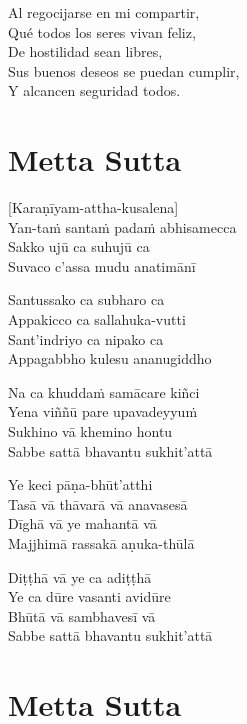 \begin{english}
	Al regocijarse en mi compartir,\\
	Qué todos los seres vivan feliz,\\
	De hostilidad sean libres,\\
	Sus buenos deseos se puedan cumplir,\\
	Y alcancen seguridad todos.
\end{english}

\chapter[Metta Sutta]{Metta Sutta}

\delegateSetUseNext


\begin{leader}
\end{leader}

[Karaṇīyam-attha-kusalena]\\
Yan-taṁ santaṁ padaṁ abhisamecca\\
Sakko ujū ca suhujū ca\\
Suvaco c'assa mudu anatimānī

Santussako ca subharo ca\\
Appakicco ca sallahuka-vutti\\
Sant'indriyo ca nipako ca\\
Appagabbho kulesu ananugiddho

Na ca khuddaṁ samācare kiñci\\
Yena viññū pare upavadeyyuṁ\\
Sukhino vā khemino hontu\\
Sabbe sattā bhavantu sukhit'attā

Ye keci pāṇa-bhūt'atthi\\
Tasā vā thāvarā vā anavasesā\\
Dīghā vā ye mahantā vā\\
Majjhimā rassakā aṇuka-thūlā

Diṭṭhā vā ye ca adiṭṭhā\\
Ye ca dūre vasanti avidūre\\
Bhūtā vā sambhavesī vā\\
Sabbe sattā bhavantu sukhit'attā

\chapter*[Metta Sutta]{Metta Sutta}

